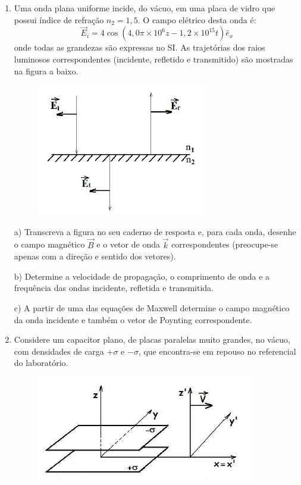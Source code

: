 \begin{enumerate}[start=1,label={\bfseries Q\arabic*.}]
\item Uma onda plana uniforme incide, do vácuo, em uma placa de vidro que possui índice de refração $n_{2}=1,5$. O campo elétrico desta onda é:
$$
\vec{E}_{i} = 4 \operatorname{cos} \left( 4,0 \pi  \times 10^{6} z - 1,2 \times 10^{15} t   \right)\hat{e}_{x}
$$
onde todas as grandezas são expressas no SI. As trajetórias dos raios luminosos correspondentes (incidente, refletido e transmitido) são mostradas na figura a baixo.
\begin{figure}[H]
\centering
\includegraphics[scale=0.7]{eletromag-img/vidro.png}
\end{figure}

a) Transcreva a figura no seu caderno de resposta e, para cada onda, desenhe o campo magnético $\vec{B}$ e o vetor de onda $\vec{k}$ correspondentes (preocupe-se apenas com a direção e sentido dos vetores).

\resposta

b) Determine a velocidade de propagação, o comprimento de onda e a frequência das ondas incidente, refletida e transmitida.

\resposta

c) A partir de uma das equações de Maxwell determine o campo magnético da onda incidente e também o vetor de Poynting correspondente.

\resposta


\item Considere um capacitor plano, de placas paralelas muito grandes, no vácuo, com densidades de carga $+\sigma$ e $-\sigma$, que encontra-se em repouso no referencial do laboratório.

\begin{figure}[H]
\centering
\includegraphics[scale=0.7]{eletromag-img/placas2.png}
\end{figure}


\end{enumerate}

